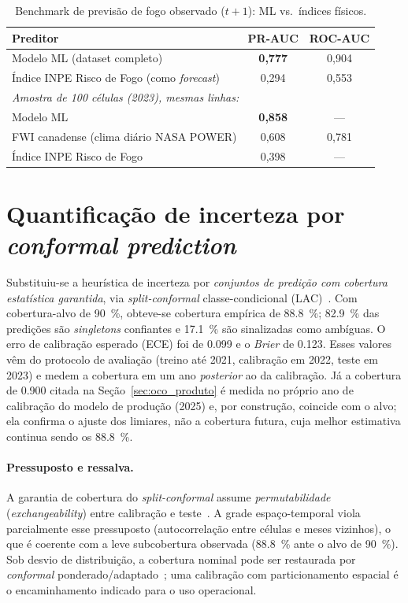 \begin{table}[h]
\centering
\caption{Benchmark de previsão de fogo observado (\(t+1\)): ML vs.\ índices físicos.}
\label{tab:oco_benchmark}
\small
\begin{tabular}{lcc}
\toprule
\textbf{Preditor} & \textbf{PR-AUC} & \textbf{ROC-AUC} \\
\midrule
Modelo ML (dataset completo) & \textbf{0,777} & 0,904 \\
Índice INPE Risco de Fogo (como \emph{forecast}) & 0,294 & 0,553 \\
\midrule
\multicolumn{3}{l}{\emph{Amostra de 100 células (2023), mesmas linhas:}} \\
\quad Modelo ML & \textbf{0,858} & --- \\
\quad FWI canadense (clima diário NASA POWER) & 0,608 & 0,781 \\
\quad Índice INPE Risco de Fogo & 0,398 & --- \\
\bottomrule
\end{tabular}
\end{table}

\section{Quantificação de incerteza por \emph{conformal prediction}}
\label{sec:oco_conformal}

Substituiu-se a heurística de incerteza por \emph{conjuntos de predição com cobertura
estatística garantida}, via \emph{split-conformal} classe-condicional
(LAC)~\cite{sadinle2019lac,mortier2024conformal}. Com cobertura-alvo de \SI{90}{\percent},
obteve-se cobertura empírica de \SI{88,8}{\percent}; \SI{82,9}{\percent} das predições são
\emph{singletons} confiantes e \SI{17,1}{\percent} são sinalizadas como ambíguas. O erro de
calibração esperado (ECE) foi de \num{0,099} e o \emph{Brier} de \num{0,123}. Esses valores
vêm do protocolo de avaliação (treino até 2021, calibração em 2022, teste em 2023) e medem a
cobertura em um ano \emph{posterior} ao da calibração. Já a cobertura de \num{0,900} citada na
Seção~\ref{sec:oco_produto} é medida no próprio ano de calibração do modelo de produção
(2025) e, por construção, coincide com o alvo; ela confirma o ajuste dos limiares, não a
cobertura futura, cuja melhor estimativa continua sendo os \SI{88,8}{\percent}.

\paragraph{Pressuposto e ressalva.} A garantia de cobertura do \emph{split-conformal} assume
\emph{permutabilidade} (\emph{exchangeability}) entre calibração e teste~\cite{angelopoulos2021gentle}.
A grade espaço-temporal viola parcialmente esse pressuposto (autocorrelação entre células e
meses vizinhos), o que é coerente com a leve subcobertura observada (\SI{88,8}{\percent} ante o
alvo de \SI{90}{\percent}). Sob desvio de distribuição, a cobertura nominal pode ser restaurada
por \emph{conformal} ponderado/adaptado~\cite{tibshirani2019conformal}; uma calibração com
particionamento espacial é o encaminhamento indicado para o uso operacional.

